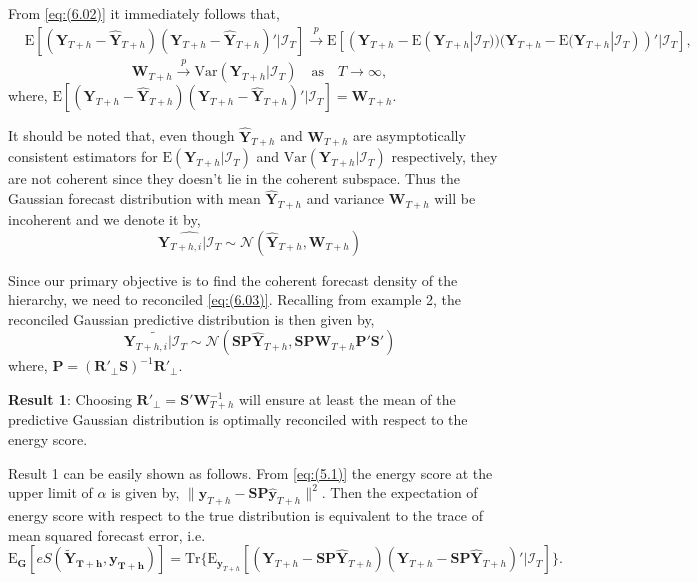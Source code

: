 \documentclass[a4paper, 11pt]{article}
\def\E{\text{E}}
\begin{document}
From \eqref{eq:(6.02)} it immediately follows that,
\begin{align*}
&\E[(\bm{Y}_{T+h} - \hat{\bm{Y}}_{T+h})(\bm{Y}_{T+h} - \hat{\bm{Y}}_{T+h})'|\bm{\mathcal{I}}_T] \overset{p}{\to} \E[(\bm{Y}_{T+h} - \E(\bm{Y}_{T+h}|\bm{\mathcal{I}}_T))(\bm{Y}_{T+h} - \E(\bm{Y}_{T+h}|\bm{\mathcal{I}}_T))'|\bm{\mathcal{I}}_T],
\end{align*}
\begin{equation}
\bm{W}_{T+h} \overset{p}{\to} \text{Var}(\bm{Y}_{T+h}|\bm{\mathcal{I}}_T) \quad \text{as} \quad T \to \infty,
\end{equation}
where, $\E[(\bm{Y}_{T+h} - \hat{\bm{Y}}_{T+h})(\bm{Y}_{T+h} - \hat{\bm{Y}}_{T+h})'|\bm{\mathcal{I}}_T] = \bm{W}_{T+h}$.

It should be noted that, even though $\hat{\bm{Y}}_{T+h}$ and $\bm{W}_{T+h}$ are asymptotically consistent estimators for $\E(\bm{Y}_{T+h}|\bm{\mathcal{I}}_T)$ and $\text{Var}(\bm{Y}_{T+h}|\bm{\mathcal{I}}_T)$ respectively, they are not coherent since they doesn't lie in the coherent subspace. Thus the Gaussian forecast distribution with mean $\hat{\bm{Y}}_{T+h}$ and variance $\bm{W}_{T+h}$ will be incoherent and we denote it by,
\begin{equation}\label{eq:(6.03)}
\widehat{\bm{Y}_{T+h,i}|\bm{\mathcal{I}}_T} \sim \mathscr{N}(\hat{\bm{Y}}_{T+h}, \bm{W}_{T+h})
\end{equation}

Since our primary objective is to find the coherent forecast density of the hierarchy, we need to reconciled \eqref{eq:(6.03)}. Recalling from example 2, the reconciled Gaussian predictive distribution is then given by,
\begin{equation}\label{eq:(6.04)}
\widetilde{\bm{Y}_{T+h,i}|\bm{\mathcal{I}}_T} \sim \mathscr{N}(\bm{SP}\hat{\bm{Y}}_{T+h}, \bm{SP}\bm{W}_{T+h}\bm{P}'\bm{S}')
\end{equation}
where, $\bm{P} = (\bm{R}'_\bot \bm{S})^{-1}\bm{R}'_\bot$.

\textbf{Result 1}: Choosing $\bm{R}'_\bot = \bm{S}'\bm{W}_{T+h}^{-1}$ will ensure at least the mean of the predictive Gaussian distribution is optimally reconciled with respect to the energy score.

Result 1 can be easily shown as follows. From \eqref{eq:(5.1)} the energy score at the upper limit of $\alpha$ is given by, $\|\bm{y}_{T+h}-\bm{SP}\hat{\bm{y}}_{T+h}\|^2$. Then the expectation of energy score with respect to the true distribution is equivalent to the trace of mean squared forecast error, i.e.
$$
\E_{\bm{G}}[eS(\bm{\tilde{Y}_{T+h},y_{T+h}})]= \text{Tr}\{\E_{\bm{y}_{T+h}}[(\bm{Y}_{T+h}-\bm{SP}\hat{\bm{Y}}_{T+h})(\bm{Y}_{T+h}-\bm{SP}\hat{\bm{Y}}_{T+h})'|\mathcal{I}_{T}]\}.
$$
\end{document}
